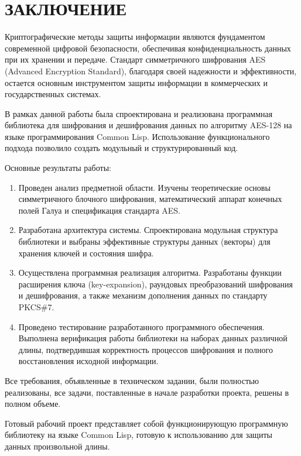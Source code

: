 \section*{ЗАКЛЮЧЕНИЕ}

Криптографические методы защиты информации являются фундаментом современной цифровой безопасности, обеспечивая конфиденциальность данных при их хранении и передаче. Стандарт симметричного шифрования AES (Advanced Encryption Standard), благодаря своей надежности и эффективности, остается основным инструментом защиты информации в коммерческих и государственных системах.

В рамках данной работы была спроектирована и реализована программная библиотека для шифрования и дешифрования данных по алгоритму AES-128 на языке программирования Common Lisp. Использование функционального подхода позволило создать модульный и структурированный код.

Основные результаты работы:

\begin{enumerate}
	\item Проведен анализ предметной области. Изучены теоретические основы симметричного блочного шифрования, математический аппарат конечных полей Галуа и спецификация стандарта AES.
	\item Разработана архитектура системы. Спроектирована модульная структура библиотеки и выбраны эффективные структуры данных (векторы) для хранения ключей и состояния шифра.
	\item Осуществлена программная реализация алгоритма. Разработаны функции расширения ключа (key-expansion), раундовых преобразований шифрования и дешифрования, а также механизм дополнения данных по стандарту PKCS\#7.
	\item Проведено тестирование разработанного программного обеспечения. Выполнена верификация работы библиотеки на наборах данных различной длины, подтвердившая корректность процессов шифрования и полного восстановления исходной информации.
\end{enumerate}

Все требования, объявленные в техническом задании, были полностью реализованы, все задачи, поставленные в начале разработки проекта, решены в полном объеме.

Готовый рабочий проект представляет собой функционирующую программную библиотеку на языке Common Lisp, готовую к использованию для защиты данных произвольной длины.